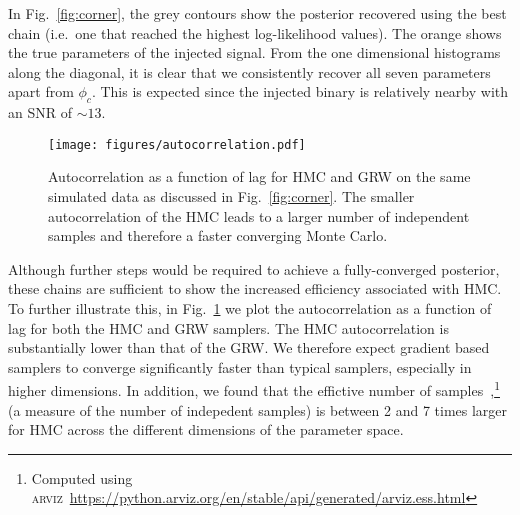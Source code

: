 \documentclass[twocolumn]{aastex631}
\newcommand{\te}[1]{\textbf{\color{pyGreen}(TE: #1)}}
\newcommand{\AZ}[1]{{\color{Burnt}[AZ: #1]}}
\newcommand{\mi}[1]{\textbf{\color{teal}(MI: #1)}}
\begin{document}

In Fig.~\ref{fig:corner}, the grey contours show the posterior recovered using the best chain (i.e.~one that reached the highest log-likelihood values).
The orange shows the true parameters of the injected signal.
From the one dimensional histograms along the diagonal, it is clear that we consistently recover all seven parameters apart from $\phi_c$.
This is expected since the injected binary is relatively nearby with an SNR of $\sim13$.

\begin{figure}[t]
	\begin{centering}
		\texttt{[image: figures/autocorrelation.pdf]}
		\caption{
			Autocorrelation as a function of lag for HMC and GRW on the same simulated data as discussed in Fig.~\ref{fig:corner}.
            The smaller autocorrelation of the HMC leads to a larger number of independent samples and therefore a faster converging Monte Carlo.
		}
		\label{fig:autocorrelation}
	\end{centering}
\end{figure}

Although further steps would be required to achieve a fully-converged posterior, these chains are sufficient to show the increased efficiency associated with HMC. 
To further illustrate this, in Fig.~\ref{fig:autocorrelation} we plot the autocorrelation as a function of lag for both the HMC and GRW samplers.
The HMC autocorrelation is substantially lower than that of the GRW.
We therefore expect gradient based samplers to converge significantly faster than typical samplers, especially in higher dimensions.
In addition, we found that the effictive number of samples~\citep{arviz_2019},\footnote{
    Computed using \textsc{arviz}~\url{https://python.arviz.org/en/stable/api/generated/arviz.ess.html}
    }
(a measure of the number of indepedent samples) is between 2 and 7 times larger for HMC across the different dimensions of the parameter space.
\end{document}

